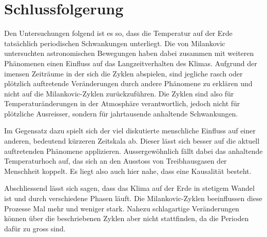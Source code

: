%
%
%
%
\section{Schlussfolgerung
\label{milankovic:section:Schlussfolgerung}}

Den Untersuchungen folgend ist es so, dass die Temperatur auf der Erde tatsächlich periodischen Schwankungen unterliegt.
Die von Milankovic untersuchten astronomischen Bewegungen haben dabei zusammen mit weiteren Phänomenen einen Einfluss auf das Langzeitverhalten des Klimas.
Aufgrund der imensen Zeiträume in der sich die Zyklen abspielen, sind jegliche rasch oder plötzlich auftretende Veränderungen durch andere Phänomene zu erklären und nicht auf die Milankovic-Zyklen zurückzuführen. 
Die Zyklen sind also für Temperaturänderungen in der Atmosphäre verantwortlich, jedoch nicht für plötzliche Ausreisser, sondern für jahrtausende anhaltende Schwankungen.

Im Gegensatz dazu spielt sich der viel diskutierte menschliche Einfluss auf einer anderen, bedeutend kürzeren Zeitskala ab.
Dieser lässt sich besser auf die aktuell auftretenden Phänomene applizieren.
Aussergewöhnlich fällt dabei das anhaltende Temperaturhoch auf, das sich an den Ausstoss von Treibhausgasen der Menschheit koppelt.
Es liegt also auch hier nahe, dass eine Kausalität besteht.

Abschliessend lässt sich sagen, dass das Klima auf der Erde in stetigem Wandel ist und durch verschiedene Phasen läuft.
Die Milankovic-Zyklen beeinflussen diese Prozesse Mal mehr und weniger stark.
Nahezu schlagartige Veränderungen können über die beschriebenen Zyklen aber nicht stattfinden, da die Perioden dafür zu gross sind.


